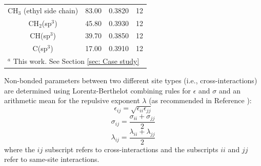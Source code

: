 \documentclass[journal=jced,manuscript=article]{achemso}
\begin{document}
\begin{table}[h!]
\begin{center}
\begin{tabular}{|c|c|c|c|}
				CH$_3$ (ethyl side chain) & 83.00 & 0.3820 & 12 \\
				CH$_2$(sp$^3$) & 45.80 & 0.3930 & 12 \\ 
				CH(sp$^3$) & 39.70 & 0.3850 & 12\\
				C(sp$^3$) & 17.00 & 0.3910 & 12 \\
				\hline
				\multicolumn{4}{|l|}{$^a$ This work. See Section \ref{sec: Case study}} \\
				\hline
			\end{tabular}
		\end{center}
	\end{table}
    
    Non-bonded parameters between two different site types (i.e., cross-interactions) are determined using Lorentz-Berthelot combining rules \cite{Allen1987} for $\epsilon$ and $\sigma$ and an arithmetic mean for the repulsive exponent $\lambda$ (as recommended in Reference ):
    \begin{equation} \label{eq:Lorentz-Berthelot_eps}
    \epsilon_{ij} = \sqrt{\epsilon_{ii} \epsilon_{jj}}
    \end{equation}
    \begin{equation} \label{eq:Lorentz-Berthelot_sig}
    \sigma_{ij} = \frac{\sigma_{ii} + \sigma_{jj}}{2}
    \end{equation}
    \begin{equation} \label{eq:Lorentz-Berthelot_lam}
    \lambda_{ij} = \frac{\lambda_{ii} + \lambda_{jj}}{2}
    \end{equation}
    where the $ij$ subscript refers to cross-interactions and the subscripts $ii$ and $jj$ refer to same-site interactions. 
    
\end{document}
